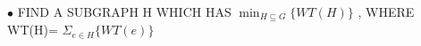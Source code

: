 \documentclass[preview]{standalone}
\begin{document}
\begin{center}
$\bullet$ FIND   A   SUBGRAPH   H  WHICH {\color{red} {HAS}} $\min_{\scriptscriptstyle H \subseteq G} \{ WT(H) \}$ ,  WHERE   WT(H)= $\Sigma_{e \in H} \{ WT(e) \}$
\end{center}
\end{document}
